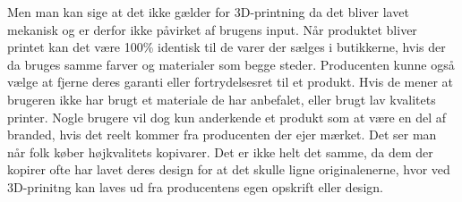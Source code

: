 Men man kan sige at det ikke gælder for 3D-printning da det bliver lavet mekanisk og er derfor ikke påvirket af brugens input. Når produktet bliver printet kan det være 100\% identisk til de varer der sælges i butikkerne, hvis der da bruges samme farver og materialer som begge steder. 
Producenten kunne også vælge at fjerne deres garanti eller fortrydelsesret til et produkt. Hvis de mener at brugeren ikke har brugt et materiale de har anbefalet, eller brugt lav kvalitets printer. 
Nogle brugere vil dog kun anderkende et produkt som at være en del af branded, hvis det reelt kommer fra producenten der ejer mærket. Det ser man når folk køber højkvalitets kopivarer. Det er ikke helt det samme, da dem der kopirer ofte har lavet deres design for at det skulle ligne originalenerne, hvor ved 3D-prinitng kan laves ud fra producentens egen opskrift eller design.



